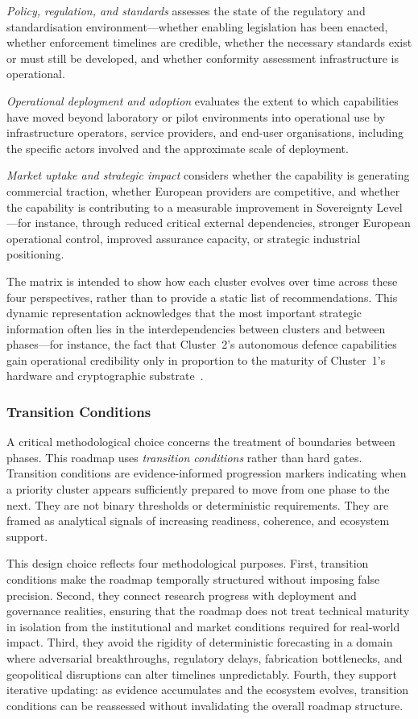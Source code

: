 \textit{Policy, regulation, and standards} assesses the state of the regulatory and standardisation environment---whether enabling legislation has been enacted, whether enforcement timelines are credible, whether the necessary standards exist or must still be developed, and whether conformity assessment infrastructure is operational.

\textit{Operational deployment and adoption} evaluates the extent to which capabilities have moved beyond laboratory or pilot environments into operational use by infrastructure operators, service providers, and end-user organisations, including the specific actors involved and the approximate scale of deployment.

\textit{Market uptake and strategic impact} considers whether the capability is generating commercial traction, whether European providers are competitive, and whether the capability is contributing to a measurable improvement in Sovereignty Level---for instance, through reduced critical external dependencies, stronger European operational control, improved assurance capacity, or strategic industrial positioning.

The matrix is intended to show how each cluster evolves over time across these four perspectives, rather than to provide a static list of recommendations. This dynamic representation acknowledges that the most important strategic information often lies in the interdependencies between clusters and between phases---for instance, the fact that Cluster~2's autonomous defence capabilities gain operational credibility only in proportion to the maturity of Cluster~1's hardware and cryptographic substrate~\cite{cloud_edge_roadmap}.


\subsubsection{Transition Conditions}
\label{sec:meth-transitions}

A critical methodological choice concerns the treatment of boundaries between phases. This roadmap uses \textit{transition conditions} rather than hard gates. Transition conditions are evidence-informed progression markers indicating when a priority cluster appears sufficiently prepared to move from one phase to the next. They are not binary thresholds or deterministic requirements. They are framed as analytical signals of increasing readiness, coherence, and ecosystem support.

This design choice reflects four methodological purposes. First, transition conditions make the roadmap temporally structured without imposing false precision. Second, they connect research progress with deployment and governance realities, ensuring that the roadmap does not treat technical maturity in isolation from the institutional and market conditions required for real-world impact. Third, they avoid the rigidity of deterministic forecasting in a domain where adversarial breakthroughs, regulatory delays, fabrication bottlenecks, and geopolitical disruptions can alter timelines unpredictably. Fourth, they support iterative updating: as evidence accumulates and the ecosystem evolves, transition conditions can be reassessed without invalidating the overall roadmap structure.

